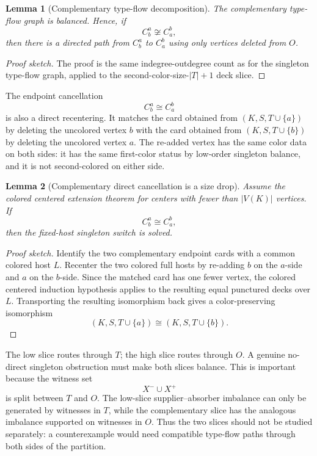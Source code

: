 \documentclass[11pt]{article}
\newtheorem{lemma}{Lemma}
\begin{document}
\begin{lemma}[Complementary type-flow decomposition]
The complementary type-flow graph is balanced.  Hence, if
\[
  C_b^a\not\cong C_a^b,
\]
then there is a directed path from \(C_b^a\) to \(C_a^b\) using only vertices
deleted from \(O\).
\end{lemma}

\begin{proof}[Proof sketch]
The proof is the same indegree-outdegree count as for the singleton
type-flow graph, applied to the second-color-size-\(|T|+1\) deck slice.
\end{proof}

The endpoint cancellation
\[
  C_b^a\cong C_a^b
\]
is also a direct recentering.  It matches the card obtained from
\((K,S,T\cup\{a\})\) by deleting the uncolored vertex \(b\) with the card
obtained from \((K,S,T\cup\{b\})\) by deleting the uncolored vertex \(a\).
The re-added vertex has the same color data on both sides: it has the same
first-color status by low-order singleton balance, and it is not
second-colored on either side.

\begin{lemma}[Complementary direct cancellation is a size drop]
Assume the colored centered extension theorem for centers with fewer than
\(|V(K)|\) vertices.  If
\[
  C_b^a\cong C_a^b,
\]
then the fixed-host singleton switch is solved.
\end{lemma}

\begin{proof}[Proof sketch]
Identify the two complementary endpoint cards with a common colored host
\(L\).  Recenter the two colored full hosts by re-adding \(b\) on the
\(a\)-side and \(a\) on the \(b\)-side.  Since the matched card has one fewer
vertex, the colored centered induction hypothesis applies to the resulting
equal punctured decks over \(L\).  Transporting the resulting isomorphism
back gives a color-preserving isomorphism
\[
  (K,S,T\cup\{a\})\cong (K,S,T\cup\{b\}).
\]
\end{proof}

The low slice routes through \(T\); the high slice routes through \(O\).  A
genuine no-direct singleton obstruction must make both slices balance.  This
is important because the witness set
\[
  X^-\cup X^+
\]
is split between \(T\) and \(O\).  The low-slice supplier--absorber imbalance
can only be generated by witnesses in \(T\), while the complementary slice has
the analogous imbalance supported on witnesses in \(O\).  Thus the two slices
should not be studied separately: a counterexample would need compatible
type-flow paths through both sides of the partition.
\end{document}
